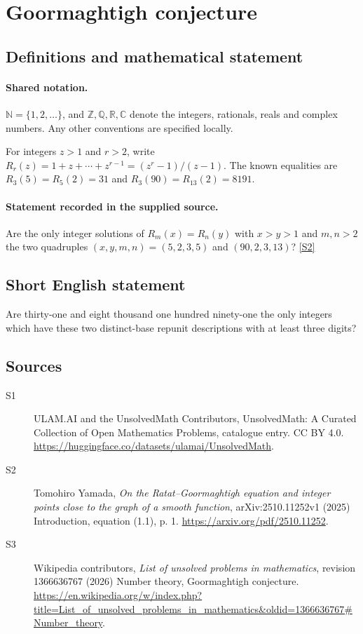 \documentclass[11pt]{article}
\newcommand{\sref}[2]{\hyperlink{source:#1:#2}{[S#2]}}
\begin{document}
\section{Goormaghtigh conjecture}\label{statement}

\subsection{Definitions and mathematical statement}

\paragraph{Shared notation.}$\mathbb N=\{1,2,\ldots\}$, and $\mathbb Z,\mathbb Q,\mathbb R,\mathbb C$ denote the integers, rationals, reals and complex numbers. Any other conventions are specified locally.


For integers $z>1$ and $r>2$, write $R_r(z)=1+z+\cdots+z^{r-1}=(z^r-1)/(z-1)$. The known equalities are $R_3(5)=R_5(2)=31$ and $R_3(90)=R_{13}(2)=8191$.
\paragraph{Statement recorded in the supplied source.}
Are the only integer solutions of $R_m(x)=R_n(y)$ with $x>y>1$ and $m,n>2$ the two quadruples $(x,y,m,n)=(5,2,3,5)$ and $(90,2,3,13)$? \sref{statement}{2}
\subsection{Short English statement}
Are thirty-one and eight thousand one hundred ninety-one the only integers which have these two distinct-base repunit descriptions with at least three digits?
\subsection{Sources}
\begin{description}
\item[\hypertarget{source:statement:1}{S1}] ULAM.AI and the UnsolvedMath Contributors, UnsolvedMath: A Curated Collection of Open Mathematics Problems, catalogue entry. CC BY 4.0. \url{https://huggingface.co/datasets/ulamai/UnsolvedMath}.
\item[\hypertarget{source:statement:2}{S2}] Tomohiro Yamada, \emph{On the Ratat--Goormaghtigh equation and integer points close to the graph of a smooth function}, arXiv:2510.11252v1 (2025) Introduction, equation (1.1), p. 1. \url{https://arxiv.org/pdf/2510.11252}.
\item[\hypertarget{source:statement:3}{S3}] Wikipedia contributors, \emph{List of unsolved problems in mathematics}, revision 1366636767 (2026) Number theory, Goormaghtigh conjecture. \url{https://en.wikipedia.org/w/index.php?title=List_of_unsolved_problems_in_mathematics&oldid=1366636767#Number_theory}.
\end{description}
\label{end:statement}
\end{document}
